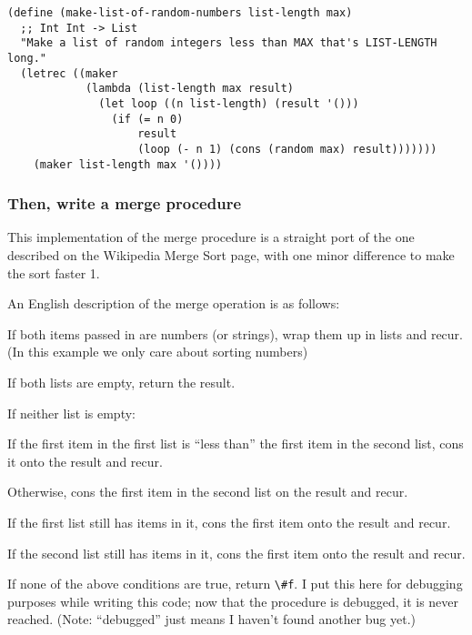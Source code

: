 \documentclass[12pt,openright,draft]{book}
\begin{document}
\begin{verbatim}
(define (make-list-of-random-numbers list-length max)
  ;; Int Int -> List
  "Make a list of random integers less than MAX that's LIST-LENGTH long."
  (letrec ((maker
            (lambda (list-length max result)
              (let loop ((n list-length) (result '()))
                (if (= n 0)
                    result
                    (loop (- n 1) (cons (random max) result)))))))
    (maker list-length max '())))
\end{verbatim}

\subsubsection{Then, write a merge procedure}

This implementation of the merge procedure is a straight port of the
one described on the Wikipedia Merge Sort page, with one minor
difference to make the sort faster 1.

An English description of the merge operation is as follows:

If both items passed in are numbers (or strings), wrap them up in
lists and recur. (In this example we only care about sorting numbers)

If both lists are empty, return the result.

If neither list is empty:

If the first item in the first list is ``less than'' the first item in
the second list, cons it onto the result and recur.

Otherwise, cons the first item in the second list on the result and
recur.

If the first list still has items in it, cons the first item onto the
result and recur.

If the second list still has items in it, cons the first item onto the
result and recur.

If none of the above conditions are true, return \verb|\#f|. I put
this here for debugging purposes while writing this code; now that the
procedure is debugged, it is never reached. (Note: ``debugged'' just
means I haven't found another bug yet.)
\end{document}
